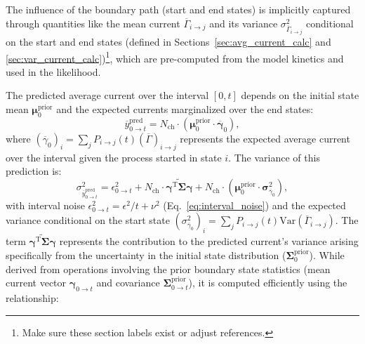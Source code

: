 \documentclass[9pt]{elife}
\begin{document}
	The influence of the boundary path (start and end states) is implicitly captured through quantities like the mean current \(\overline{\Gamma}_{i \rightarrow j}\) and its variance \(\sigma^2_{\overline{\Gamma}_{i \rightarrow j}}\) conditional on the start and end states (defined in Sections~\ref{sec:avg_current_calc} and \ref{sec:var_current_calc})\footnote{Make sure these section labels exist or adjust references.}, which are pre-computed from the model kinetics and used in the likelihood.
	
	The predicted average current over the interval \([0, t]\) depends on the initial state mean \(\boldsymbol{\mu}^{\text{prior}}_0\) and the expected currents marginalized over the end states:
	\begin{equation}
		\overline{y}^{\text{pred}}_{0 \rightarrow t} = N_{\text{ch}} \cdot (\boldsymbol{\mu}^{\text{prior}}_{0} \cdot \overline{\boldsymbol{\gamma}}_{0}),
		\label{eq:macro_interval_predicted_y}
	\end{equation}
	where \( (\overline{\gamma}_{0})_i = \sum_j P_{i\rightarrow j}(t) (\overline{\Gamma})_{i \rightarrow j} \) represents the expected average current over the interval given the process started in state \(i\). The variance of this prediction is:
	\begin{equation}
		\sigma^2_{\overline{y}^{\text{pred}}_{0 \rightarrow t}} = \epsilon^2_{0 \rightarrow t} + N_{\text{ch}} \cdot \widetilde{\mathbf{\gamma}^{\mathrm{T}} \mathbf{\Sigma}\mathbf{\gamma}} + N_{\text{ch}} \cdot (\boldsymbol{\mu}^{\text{prior}}_{0} \cdot \boldsymbol{\sigma}^2_{\overline{\gamma}_{0}}),
		\label{eq:macro_interval_sigma_pred}
	\end{equation}
	with interval noise \( \epsilon^2_{0 \rightarrow t} = \epsilon^2/t + \nu^2 \) (Eq.~\ref{eq:interval_noise}) and the expected variance conditional on the start state \( (\sigma^2_{\overline{\gamma}_{0}})_i = \sum_j P_{i\rightarrow j}(t) \mathrm{Var}(\overline{\Gamma}_{i\rightarrow j}) \). The term \( \widetilde{\mathbf{\gamma}^{\mathrm{T}} \mathbf{\Sigma}\mathbf{\gamma}} \) represents the contribution to the predicted current's variance arising specifically from the uncertainty in the initial state distribution (\( \boldsymbol{\Sigma}^{\text{prior}}_{0} \)). While derived from operations involving the prior boundary state statistics (mean current vector \(\boldsymbol{\gamma}_{0 \rightarrow t}\) and covariance \(\boldsymbol{\Sigma}^{\text{prior}}_{0 \rightarrow t}\)), it is computed efficiently using the relationship:
\end{document}
